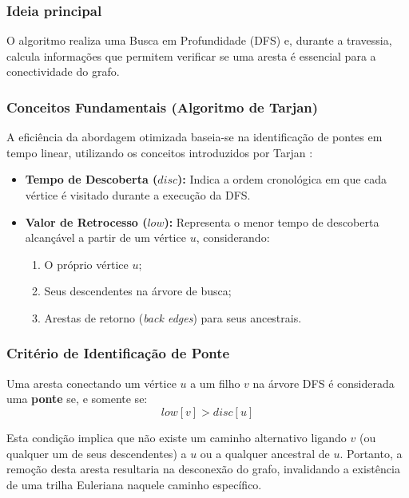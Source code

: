 \documentclass{sbc2023}%
\begin{document}
\subsubsection{Ideia principal}

O algoritmo realiza uma Busca em Profundidade (DFS) e, durante a travessia, calcula informações que permitem verificar se uma aresta é essencial para a conectividade do grafo.

\subsubsection{Conceitos Fundamentais (Algoritmo de Tarjan)}

A eficiência da abordagem otimizada baseia-se na identificação de pontes em tempo linear, utilizando os conceitos introduzidos por Tarjan \cite{tarjan1972dfs}:

\begin{itemize}
    \item \textbf{Tempo de Descoberta ($disc$):} Indica a ordem cronológica em que cada vértice é visitado durante a execução da DFS.
    
    \item \textbf{Valor de Retrocesso ($low$):} Representa o menor tempo de descoberta alcançável a partir de um vértice $u$, considerando:
    \begin{enumerate}
        \item O próprio vértice $u$;
        \item Seus descendentes na árvore de busca;
        \item Arestas de retorno (\textit{back edges}) para seus ancestrais.
    \end{enumerate}
\end{itemize}

\subsubsection{Critério de Identificação de Ponte}
Uma aresta conectando um vértice $u$ a um filho $v$ na árvore DFS é considerada uma \textbf{ponte} se, e somente se:
\begin{equation}
    low[v] > disc[u]
\end{equation}

Esta condição implica que não existe um caminho alternativo ligando $v$ (ou qualquer um de seus descendentes) a $u$ ou a qualquer ancestral de $u$. Portanto, a remoção desta aresta resultaria na desconexão do grafo, invalidando a existência de uma trilha Euleriana naquele caminho específico.
\end{document}
